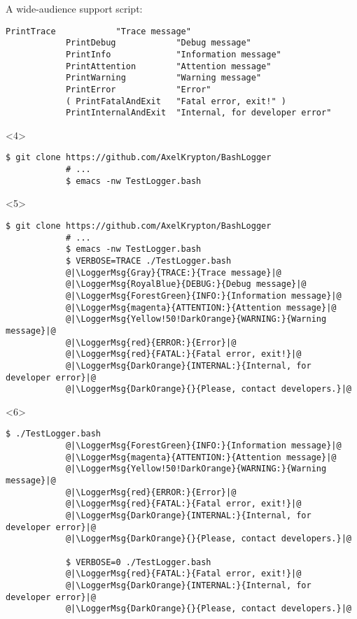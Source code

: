 \begin{frame}[fragile]{A wide-audience support script: }
\begin{onlyenv}
\begin{lstlisting}[style=myBash, numbers=none, style=smaller]
            PrintTrace            "Trace message"
            PrintDebug            "Debug message"
            PrintInfo             "Information message"
            PrintAttention        "Attention message"
            PrintWarning          "Warning message"
            PrintError            "Error"
            ( PrintFatalAndExit   "Fatal error, exit!" )
            PrintInternalAndExit  "Internal, for developer error"
        \end{lstlisting}
    \end{onlyenv}
    \begin{onlyenv}<4>
        \begin{lstlisting}[style=myBash, aboveskip=3mm]
            $ git clone https://github.com/AxelKrypton/BashLogger
            # ...
            $ emacs -nw TestLogger.bash
        \end{lstlisting}
    \end{onlyenv}
    \begin{onlyenv}<5>
        \begin{lstlisting}[style=myBash, aboveskip=3mm]
            $ git clone https://github.com/AxelKrypton/BashLogger
            # ...
            $ emacs -nw TestLogger.bash
            $ VERBOSE=TRACE ./TestLogger.bash
            @|\LoggerMsg{Gray}{TRACE:}{Trace message}|@
            @|\LoggerMsg{RoyalBlue}{DEBUG:}{Debug message}|@
            @|\LoggerMsg{ForestGreen}{INFO:}{Information message}|@
            @|\LoggerMsg{magenta}{ATTENTION:}{Attention message}|@
            @|\LoggerMsg{Yellow!50!DarkOrange}{WARNING:}{Warning message}|@
            @|\LoggerMsg{red}{ERROR:}{Error}|@
            @|\LoggerMsg{red}{FATAL:}{Fatal error, exit!}|@
            @|\LoggerMsg{DarkOrange}{INTERNAL:}{Internal, for developer error}|@
            @|\LoggerMsg{DarkOrange}{}{Please, contact developers.}|@
        \end{lstlisting}
    \end{onlyenv}
    \begin{onlyenv}<6>
        \begin{lstlisting}[style=myBash, firstnumber=14, aboveskip=3mm]
            $ ./TestLogger.bash
            @|\LoggerMsg{ForestGreen}{INFO:}{Information message}|@
            @|\LoggerMsg{magenta}{ATTENTION:}{Attention message}|@
            @|\LoggerMsg{Yellow!50!DarkOrange}{WARNING:}{Warning message}|@
            @|\LoggerMsg{red}{ERROR:}{Error}|@
            @|\LoggerMsg{red}{FATAL:}{Fatal error, exit!}|@
            @|\LoggerMsg{DarkOrange}{INTERNAL:}{Internal, for developer error}|@
            @|\LoggerMsg{DarkOrange}{}{Please, contact developers.}|@

            $ VERBOSE=0 ./TestLogger.bash
            @|\LoggerMsg{red}{FATAL:}{Fatal error, exit!}|@
            @|\LoggerMsg{DarkOrange}{INTERNAL:}{Internal, for developer error}|@
            @|\LoggerMsg{DarkOrange}{}{Please, contact developers.}|@
        \end{lstlisting}
    \end{onlyenv}
\end{frame}

